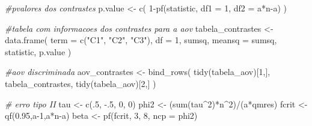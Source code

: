 \documentclass[
]{article}
\newenvironment{Shaded}{\begin{snugshade}}{\end{snugshade}}
\newcommand{\AttributeTok}[1]{\textcolor[rgb]{0.77,0.63,0.00}{#1}}
\newcommand{\CommentTok}[1]{\textcolor[rgb]{0.56,0.35,0.01}{\textit{#1}}}
\newcommand{\DecValTok}[1]{\textcolor[rgb]{0.00,0.00,0.81}{#1}}
\newcommand{\FloatTok}[1]{\textcolor[rgb]{0.00,0.00,0.81}{#1}}
\newcommand{\FunctionTok}[1]{\textcolor[rgb]{0.00,0.00,0.00}{#1}}
\newcommand{\NormalTok}[1]{#1}
\newcommand{\OtherTok}[1]{\textcolor[rgb]{0.56,0.35,0.01}{#1}}
\newcommand{\SpecialCharTok}[1]{\textcolor[rgb]{0.00,0.00,0.00}{#1}}
\newcommand{\StringTok}[1]{\textcolor[rgb]{0.31,0.60,0.02}{#1}}
\begin{document}
\begin{Shaded}
\begin{Highlighting}[]
\CommentTok{\#pvalores dos contrastes}
\NormalTok{p.value }\OtherTok{\textless{}{-}} \FunctionTok{c}\NormalTok{(}
  \DecValTok{1}\SpecialCharTok{{-}}\FunctionTok{pf}\NormalTok{(statistic, }\AttributeTok{df1 =} \DecValTok{1}\NormalTok{, }\AttributeTok{df2 =}\NormalTok{ a}\SpecialCharTok{*}\NormalTok{n}\SpecialCharTok{{-}}\NormalTok{a)}
\NormalTok{)}

\CommentTok{\#tabela com informacoes dos contrastes para a aov}
\NormalTok{tabela\_contrastes }\OtherTok{\textless{}{-}} \FunctionTok{data.frame}\NormalTok{(}
  \AttributeTok{term =} \FunctionTok{c}\NormalTok{(}\StringTok{"C1"}\NormalTok{, }\StringTok{"C2"}\NormalTok{, }\StringTok{"C3"}\NormalTok{),}
  \AttributeTok{df =} \DecValTok{1}\NormalTok{,}
\NormalTok{  sumsq, }\AttributeTok{meansq =}\NormalTok{ sumsq, statistic, p.value}
\NormalTok{)}

\CommentTok{\#aov discriminada}
\NormalTok{aov\_contrastes }\OtherTok{\textless{}{-}} \FunctionTok{bind\_rows}\NormalTok{(}
  \FunctionTok{tidy}\NormalTok{(tabela\_aov)[}\DecValTok{1}\NormalTok{,],}
\NormalTok{  tabela\_contrastes,}
  \FunctionTok{tidy}\NormalTok{(tabela\_aov)[}\DecValTok{2}\NormalTok{,]}
\NormalTok{)}

\CommentTok{\# erro tipo II}
\NormalTok{tau }\OtherTok{\textless{}{-}} \FunctionTok{c}\NormalTok{(.}\DecValTok{5}\NormalTok{, }\SpecialCharTok{{-}}\NormalTok{.}\DecValTok{5}\NormalTok{, }\DecValTok{0}\NormalTok{, }\DecValTok{0}\NormalTok{)}
\NormalTok{phi2 }\OtherTok{\textless{}{-}}\NormalTok{ (}\FunctionTok{sum}\NormalTok{(tau}\SpecialCharTok{\^{}}\DecValTok{2}\NormalTok{)}\SpecialCharTok{*}\NormalTok{n}\SpecialCharTok{\^{}}\DecValTok{2}\NormalTok{)}\SpecialCharTok{/}\NormalTok{(a}\SpecialCharTok{*}\NormalTok{qmres)}
\NormalTok{fcrit }\OtherTok{\textless{}{-}} \FunctionTok{qf}\NormalTok{(}\FloatTok{0.95}\NormalTok{,a}\DecValTok{{-}1}\NormalTok{,a}\SpecialCharTok{*}\NormalTok{n}\SpecialCharTok{{-}}\NormalTok{a)}
\NormalTok{beta }\OtherTok{\textless{}{-}} \FunctionTok{pf}\NormalTok{(fcrit, }\DecValTok{3}\NormalTok{, }\DecValTok{8}\NormalTok{, }\AttributeTok{ncp =}\NormalTok{ phi2)}


\end{Highlighting}
\end{Shaded}
\end{document}
